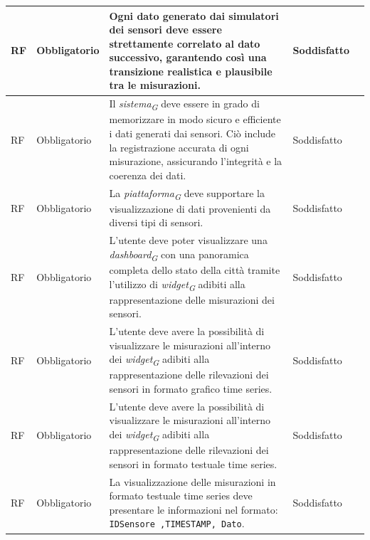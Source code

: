 \begin{longtable}{|C{1.5cm}|C{2cm}|L{5cm}|C{2cm}|C{1.5cm}|}
    \hline
     RF & Obbligatorio &  Ogni dato generato dai simulatori dei sensori deve essere strettamente correlato al dato successivo, garantendo così una transizione realistica e plausibile tra le misurazioni.& Soddisfatto \\
    
    \hline
     RF & Obbligatorio & Il \textit{sistema}\textsubscript{\textit{G}} deve essere in grado di memorizzare in modo sicuro e efficiente i dati generati dai sensori. Ciò include la registrazione accurata di ogni misurazione, assicurando l'integrità e la coerenza dei dati.& Soddisfatto \\
    
    \hline
     RF & Obbligatorio & La \textit{piattaforma}\textsubscript{\textit{G}} deve supportare la visualizzazione di dati provenienti da diversi tipi di sensori.& Soddisfatto \\
    
    \hline
     RF & Obbligatorio & L'utente deve poter visualizzare una \textit{dashboard}\textsubscript{\textit{G}} con una panoramica completa dello stato della città tramite l'utilizzo di \textit{widget}\textsubscript{\textit{G}} adibiti alla rappresentazione delle misurazioni dei sensori.& Soddisfatto \\
    
    \hline
     RF & Obbligatorio & L'utente deve avere la possibilità di visualizzare le misurazioni all'interno dei \textit{widget}\textsubscript{\textit{G}} adibiti alla rappresentazione delle rilevazioni dei sensori in formato grafico time series.& Soddisfatto \\
    
    \hline
     RF & Obbligatorio & L'utente deve avere la possibilità di visualizzare le misurazioni all'interno dei \textit{widget}\textsubscript{\textit{G}} adibiti alla rappresentazione delle rilevazioni dei sensori in formato testuale time series.& Soddisfatto \\
    
    \hline
     RF & Obbligatorio & La visualizzazione delle misurazioni in formato testuale time series deve presentare le informazioni nel formato: \texttt{IDSensore ,TIMESTAMP, Dato}.& Soddisfatto \\
   

\end{longtable}
